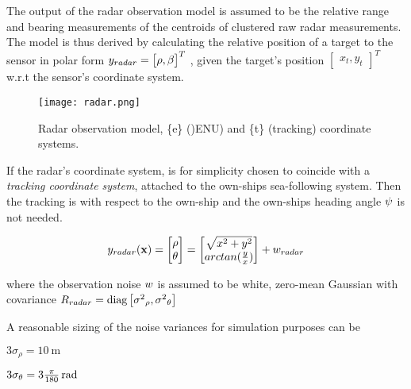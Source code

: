 The output of the radar observation model is assumed to be the relative range and bearing measurements of the centroids of clustered raw radar measurements. The model is thus derived by calculating the relative position of a target to the sensor in polar form ${{y}}_{radar} = \begin{bmatrix}
{\rho},
{\beta}
\end{bmatrix}^{T}$ , given the target's position $\begin{bmatrix}x_t, y_t\end{bmatrix}^{T}$ w.r.t the sensor's coordinate system.

\begin{figure}[H]
	\centering
	\texttt{[image: radar.png]}
	\caption{Radar observation model, \{e\} ()ENU) and \{t\} (tracking) coordinate systems.}
	\label{fig:radar_observation_model}
\end{figure}


If the radar's coordinate system, is for simplicity  chosen to coincide with a \emph{tracking coordinate system},  attached to the own-ships sea-following system. Then the tracking is with respect to the own-ship and the own-ships heading angle ${\psi}$ is not needed.


\begin{equation}
{{y}}_{radar}(\mathbf{x}) = \begin{bmatrix}
\rho \\
\theta
\end{bmatrix} = \begin{bmatrix}
\sqrt{x^2 + y^2} \\
arctan(\frac{y}{x})
\end{bmatrix} + {w}_{radar}
\end{equation}


where the observation noise ${w}$ is assumed to be white, zero-mean Gaussian with covariance ${R}_{radar} = \text{diag}\left[{\sigma^2}_{\rho}, {\sigma^2}_{\theta}\right] $



A reasonable sizing of the noise variances for simulation purposes can be
\begin{description}
	\item $3\sigma_\rho = \SI{10}{\meter}$
	\item $3\sigma_\theta = \SI[parse-numbers=false]{3\frac{\pi}{180}}{\radian}  $
\end{description}

